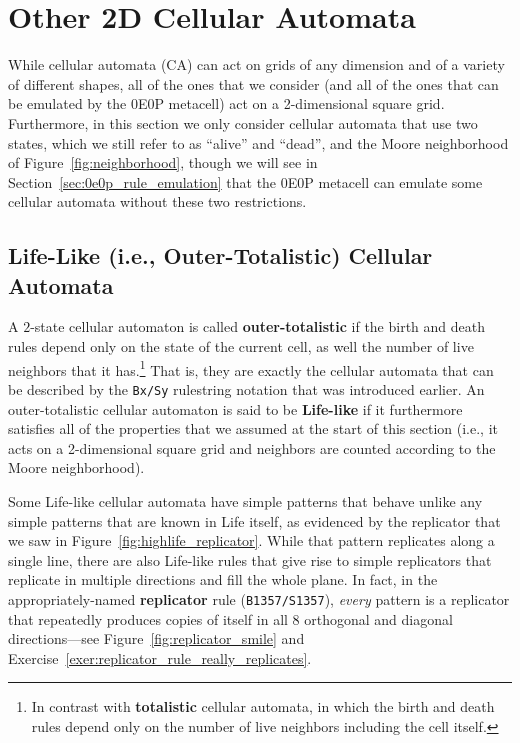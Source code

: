 \section{Other 2D Cellular Automata}\label{sec:other_ca_rules}

While cellular automata (CA) can act on grids of any dimension and of a variety of different shapes, all of the ones that we consider (and all of the ones that can be emulated by the 0E0P metacell) act on a 2-dimensional square grid. Furthermore, in this section we only consider cellular automata that use two states, which we still refer to as ``alive'' and ``dead'', and the Moore neighborhood of Figure~\ref{fig:neighborhood}, though we will see in Section~\ref{sec:0e0p_rule_emulation} that the 0E0P metacell can emulate some cellular automata without these two restrictions.


\subsection{Life-Like (i.e., Outer-Totalistic) Cellular Automata}\label{sec:lifelike_rules}

A $2$-state cellular automaton is called \textbf{outer-totalistic} if the birth and death rules depend only on the state of the current cell, as well the number of live neighbors that it has.\footnote{In contrast with \textbf{totalistic} cellular automata, in which the birth and death rules depend only on the number of live neighbors including the cell itself.} That is, they are exactly the cellular automata that can be described by the \texttt{Bx/Sy} rulestring notation that was introduced earlier. An outer-totalistic cellular automaton is said to be \textbf{Life-like} if it furthermore satisfies all of the properties that we assumed at the start of this section (i.e., it acts on a 2-dimensional square grid and neighbors are counted according to the Moore neighborhood).

Some Life-like cellular automata have simple patterns that behave unlike any simple patterns that are known in Life itself, as evidenced by the replicator that we saw in Figure~\ref{fig:highlife_replicator}. While that pattern replicates along a single line, there are also Life-like rules that give rise to simple replicators that replicate in multiple directions and fill the whole plane. In fact, in the appropriately-named \textbf{replicator} rule (\texttt{B1357/S1357}), \emph{every} pattern is a replicator that repeatedly produces copies of itself in all $8$ orthogonal and diagonal directions---see Figure~\ref{fig:replicator_smile} and Exercise~\ref{exer:replicator_rule_really_replicates}.

